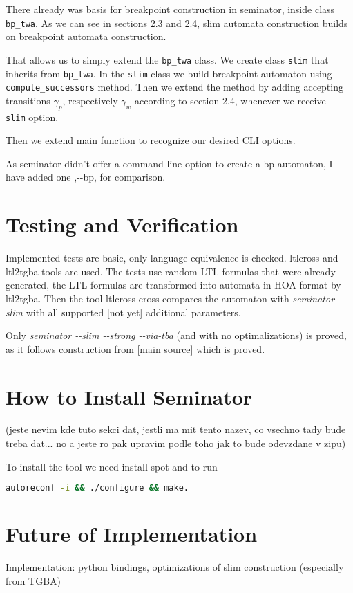 \documentclass[
	digital
nolof, nolot
]{fithesis3}
\begin{document}
	There already was basis for breakpoint construction in seminator, inside class \texttt{bp\_twa}.
	As we can see in sections 2.3 and 2.4, slim automata construction builds on breakpoint automata construction.
	
	That allows us to simply extend the \texttt{bp\_twa} class.
	We create class \texttt{slim} that inherits from \texttt{bp\_twa}.
	In the \texttt{slim} class we build breakpoint automaton using \texttt{compute\_successors} method.
	Then we extend the method by adding accepting transitions $\gamma_p$, respectively $\gamma_w$ according to section 2.4, whenever we receive \texttt{-{}-slim} option.
	
	Then we extend main function to recognize our desired CLI options.
	
	As seminator didn't offer a command line option to create a bp automaton, I have added one ,-{}-bp, for comparison.
	
	
	
	\section{Testing and Verification}
	Implemented tests are basic, only language equivalence is checked.
	ltlcross and ltl2tgba tools are used. The tests use random LTL formulas that were already generated, the LTL formulas are transformed into automata in HOA format by ltl2tgba.
	Then the tool ltlcross cross-compares the automaton with \emph{seminator -{}-slim} with all supported [not yet] additional parameters.
	
	Only \emph{seminator -{}-slim -{}-strong -{}-via-tba} (and with no optimalizations) is proved, as it follows construction from [main source] which is proved.
	
	
	\section{How to Install Seminator}
	(jeste nevim kde tuto sekci dat, jestli ma mit tento nazev, co vsechno tady bude treba dat... no a jeste ro pak upravim podle toho jak to bude odevzdane v zipu)
	
	To install the tool we need install spot and to run 
	
	\begin{lstlisting}[language=bash]
autoreconf -i && ./configure && make.
	\end{lstlisting}
	\section{Future of Implementation}
	Implementation:
	python bindings, optimizations of slim construction (especially from TGBA)
	
\end{document}

